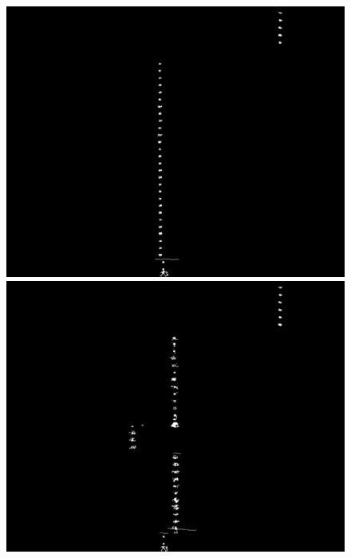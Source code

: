 \begin{figure}[ht!]
	\begin{minipage}[t]{0.3\textwidth}
		\centering	
		\includegraphics[width=1\textwidth]{figures/ImageAnalysis/Canny/s2.png}
	\end{minipage}
	\hspace{0.02\textwidth}
	\begin{minipage}[t]{0.3\textwidth}
		\centering	
		\includegraphics[width=1\textwidth]{figures/ImageAnalysis/Canny/s5.png}
	\end{minipage}
	\hspace{0.02\textwidth}
	\begin{minipage}[t]{0.3\textwidth}

\end{minipage}
\end{figure}
